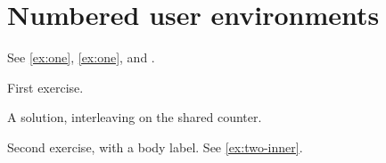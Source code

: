 \section{Numbered user environments}

See \ref{ex:one}, \cref{ex:one}, and .

\begin{exercise}[Warm-up]\label{ex:one}
First exercise.
\end{exercise}

\begin{solution}
A solution, interleaving on the shared counter.
\end{solution}

\begin{exercise}\label{ex:two}
\label{ex:two-inner}
Second exercise, with a body label. See \ref{ex:two-inner}.
\end{exercise}

